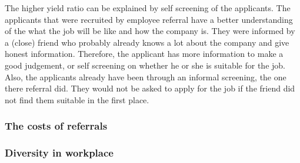\documentclass[Main.tex]{subfiles}
\begin{document}
The higher yield ratio can be explained by self screening of the applicants. The applicants that were recruited by employee referral have a better understanding of the what the job will be like and how the company is. They were informed by a (close) friend who probably already knows a lot about the company and give honest information. Therefore, the applicant has more information to make a good judgement, or self screening on whether he or she is suitable for the job. Also, the applicants already have been through an informal screening, the one there referral did. They would not be asked to apply for the job if the friend did not find them suitable in the first place. 

\subsubsection*{The costs of referrals}

\subsubsection*{Diversity in workplace}
\end{document}
